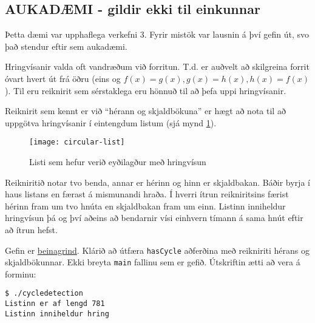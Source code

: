 \documentclass{article}
\begin{document}
\newpage
\subsection{AUKADÆMI - gildir ekki til einkunnar}
Þetta dæmi var upphaflega verkefni 3. Fyrir mistök var lausnin á því gefin út, svo það stendur eftir sem aukadæmi.

Hringvísanir valda oft vandræðum við forritun. T.d. er auðvelt að skilgreina forrit óvart hvert út frá öðru (eins og $f(x) = g(x), g(x) = h(x), h(x) = f(x)$). Til eru reiknirit sem sérstaklega eru hönnuð til að þefa uppi hringvísanir.

Reiknirit sem kennt er við ``hérann og skjaldbökuna'' er hægt að nota til að uppgötva hringvísanir í eintengdum listum (sjá mynd \ref{fig:circular-list}).

\begin{figure}[b]
    \caption{Listi sem hefur verið eyðilagður með hringvísun}
    \label{fig:circular-list}
    \texttt{[image: circular-list]}
\end{figure}

Reikniritið notar tvo benda, annar er hérinn og hinn er skjaldbakan. Báðir byrja í haus listans en færast á mismunandi hraða. Í hverri ítrun reikniritsins færist hérinn fram um tvo hnúta en skjaldbakan fram um einn. Listinn inniheldur hringvísun þá og því aðeins að bendarnir vísi einhvern tímann á sama hnút eftir að ítrun hefst. 

Gefin er \href{https://raw.githubusercontent.com/Ernir/kennsluefni/master/T2/Code/w4/cycledetection.cpp}{beinagrind}. Klárið að útfæra \texttt{hasCycle} aðferðina með reikniriti hérans og skjaldbökunnar. Ekki breyta \texttt{main} fallinu sem er gefið. Útskriftin ætti að vera á forminu:

\begin{verbatim}
$ ./cycledetection
Listinn er af lengd 781
Listinn inniheldur hring
\end{verbatim}

\vfill
\end{document}
